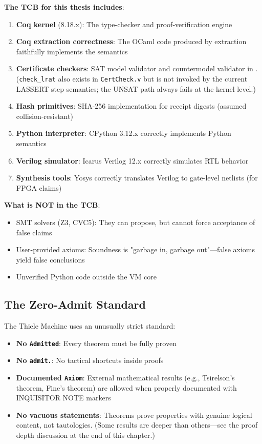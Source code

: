 \begin{tcolorbox}[thesisbox,colback=red!5!white,colframe=red!75!black,title=What Must Be Trusted]
\textbf{The TCB for this thesis includes}:
\begin{enumerate}
    \item \textbf{Coq kernel} (8.18.x): The type-checker and proof-verification engine
    \item \textbf{Coq extraction correctness}: The OCaml code produced by extraction faithfully implements the semantics
    \item \textbf{Certificate checkers}: SAT model validator and countermodel validator in . (\texttt{check\_lrat} also exists in \texttt{CertCheck.v} but is not invoked by the current LASSERT step semantics; the UNSAT path always fails at the kernel level.)
    \item \textbf{Hash primitives}: SHA-256 implementation for receipt digests (assumed collision-resistant)
    \item \textbf{Python interpreter}: CPython 3.12.x correctly implements Python semantics
    \item \textbf{Verilog simulator}: Icarus Verilog 12.x correctly simulates RTL behavior
    \item \textbf{Synthesis tools}: Yosys correctly translates Verilog to gate-level netlists (for FPGA claims)
\end{enumerate}

\textbf{What is NOT in the TCB}:
\begin{itemize}
    \item SMT solvers (Z3, CVC5): They can propose, but cannot force acceptance of false claims
    \item User-provided axioms: Soundness is "garbage in, garbage out"---false axioms yield false conclusions
    \item Unverified Python code outside the VM core
\end{itemize}
\end{tcolorbox}

\subsection{The Zero-Admit Standard}

The Thiele Machine uses an unusually strict standard:
\begin{itemize}
    \item \textbf{No \texttt{Admitted}}: Every theorem must be fully proven
    \item \textbf{No \texttt{admit.}}: No tactical shortcuts inside proofs
    \item \textbf{Documented \texttt{Axiom}}: External mathematical results (e.g., Tsirelson's theorem, Fine's theorem) are allowed when properly documented with INQUISITOR NOTE markers
    \item \textbf{No vacuous statements}: Theorems prove properties with genuine logical content, not tautologies. (Some results are deeper than others---see the proof depth discussion at the end of this chapter.)
\end{itemize}

